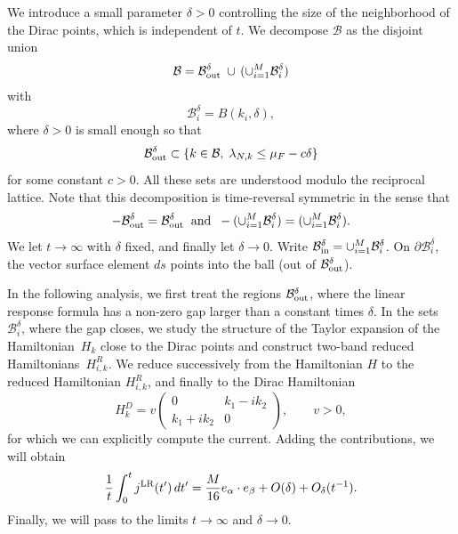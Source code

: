 \documentclass[a4paper,11pt]{article}
\theoremstyle{plain}
\theoremstyle{remark}
\begin{document}
We introduce a small parameter $\delta>0$ controlling the size of the
neighborhood of the Dirac points, which is independent of $t$.
We decompose $\mathcal B$ as the disjoint union
\begin{align*}
  \mathcal B=\mathcal B_{\rm out}^{\delta}\; \cup  \, (\cup_{i=1}^M \mathcal B_{i}^{\delta})
\end{align*}
with
\[ \mathcal B_i^\delta= B(k_{i}, \delta),\]
where $\delta > 0$ is small enough so that
\[\mathcal B_{\rm out}^{\delta}\subset \{k\in\mathcal B,\;
  \lambda_{N,k} \leq \mu_F-c\delta\}\]
for some constant $c>0$. All these sets are understood modulo the
reciprocal lattice. Note that this decomposition is time-reversal
symmetric in the sense that
\[
  -\mathcal B_{\rm out}^{\delta} = \mathcal
B_{\rm out}^{\delta}\;\; \mbox{and}\;\;
  - (\cup_{i=1}^M \mathcal B_{i}^{\delta}) = (\cup_{i=1}^M \mathcal B_{i}^{\delta}).
\]
We let $t\to\infty$ with $\delta$ fixed, and finally let $\delta\to0$.
Write $\mathcal B_{\rm in}^\delta=\cup_{i=1}^M\mathcal B_i^\delta$.
On $\partial\mathcal B_i^\delta$, the vector surface element $ds$ points
into the ball (out of $\mathcal B_{\rm out}^\delta$).

\medskip

In the following analysis, we first treat the regions
$\mathcal B_{\rm out}^{\delta}$, where the linear response formula
has a non-zero gap larger than a constant times $\delta$. In the sets
$\mathcal B_{i}^{\delta}$, where the gap closes, we study the structure of the Taylor expansion of the Hamiltonian~$H_k$ close to the Dirac points and construct two-band reduced Hamiltonians~$H_{i,k}^{R}$. We reduce successively from the
Hamiltonian $H$ to the reduced Hamiltonian
$H_{i,k}^{R}$,
and finally to the
Dirac Hamiltonian
\[H_k^{D} = v\begin{pmatrix} 0 & k_1-ik_2 \\ k_1+ik_2 & 0\end{pmatrix},\qquad v>0,\]
for which we can explicitly
compute the current. Adding the contributions, we will obtain
\begin{align*}
\frac1t\int_0^t j^{\rm LR}(t')\,dt'
=\frac{M}{16}e_\alpha\cdot e_\beta+O(\delta)+O_\delta(t^{-1}).
\end{align*}
Finally, we will pass to the limits $t\to\infty$ and $\delta\to0$.
\end{document}
